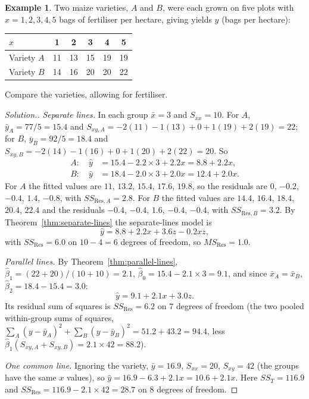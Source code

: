 \documentclass[11pt,a4paper]{article}
\numberwithin{equation}{section}
\theoremstyle{definition}
\newtheorem{exa}[thm]{Example}
\newenvironment{solution}
  {\renewcommand{\qedsymbol}{}\begin{proof}[\textit{Solution}.]}
  {\end{proof}}
\begin{document}
\begin{exa}\label{exa:varieties}
Two maize varieties, $A$ and $B$, were each grown on five plots with $x = 1, 2, 3, 4, 5$ bags of fertiliser per
hectare, giving yields $y$ (bags per hectare):
\begin{center}
\begin{tabular}{l|ccccc}
$x$ & 1 & 2 & 3 & 4 & 5 \\
\hline
Variety $A$ & 11 & 13 & 15 & 19 & 19 \\
Variety $B$ & 14 & 16 & 20 & 20 & 22 \\
\end{tabular}
\end{center}
Compare the varieties, allowing for fertiliser.
\end{exa}

\begin{solution}
\emph{Separate lines.} In each group $\bar x = 3$ and $S_{xx} = 10$. For $A$, $\bar y_A = 77/5 = 15.4$ and
$S_{xy,A} = -2(11) - 1(13) + 0 + 1(19) + 2(19) = 22$; for $B$, $\bar y_B = 92/5 = 18.4$ and
$S_{xy,B} = -2(14) - 1(16) + 0 + 1(20) + 2(22) = 20$. So
\begin{align*}
A:\quad \hat y &= 15.4 - 2.2 \times 3 + 2.2x = 8.8 + 2.2x , \\
B:\quad \hat y &= 18.4 - 2.0 \times 3 + 2.0x = 12.4 + 2.0x .
\end{align*}
For $A$ the fitted values are $11$, $13.2$, $15.4$, $17.6$, $19.8$, so the residuals are
$0$, $-0.2$, $-0.4$, $1.4$, $-0.8$, with $SS_{\mathrm{Res},A} = 2.8$. For $B$ the fitted values are
$14.4$, $16.4$, $18.4$, $20.4$, $22.4$ and the residuals $-0.4$, $-0.4$, $1.6$, $-0.4$, $-0.4$, with $SS_{\mathrm{Res},B} = 3.2$.
By Theorem~\ref{thm:separate-lines} the separate-lines model is
\[
\hat y = 8.8 + 2.2x + 3.6z - 0.2xz ,
\]
with $SS_{\mathrm{Res}} = 6.0$ on $10 - 4 = 6$ degrees of freedom, so $MS_{\mathrm{Res}} = 1.0$.

\emph{Parallel lines.} By Theorem~\ref{thm:parallel-lines}, $\hat\beta_1 = (22 + 20)/(10 + 10) = 2.1$,
$\hat\beta_0 = 15.4 - 2.1 \times 3 = 9.1$, and since $\bar x_A = \bar x_B$, $\hat\beta_2 = 18.4 - 15.4 = 3.0$:
\[
\hat y = 9.1 + 2.1x + 3.0z .
\]
Its residual sum of squares is $SS_{\mathrm{Res}} = 6.2$ on $7$ degrees of freedom (the two pooled
within-group sums of squares, $\sum_A(y - \bar y_A)^2 + \sum_B(y - \bar y_B)^2 = 51.2 + 43.2 = 94.4$, less
$\hat\beta_1(S_{xy,A} + S_{xy,B}) = 2.1 \times 42 = 88.2$).

\emph{One common line.} Ignoring the variety, $\bar y = 16.9$, $S_{xx} = 20$, $S_{xy} = 42$ (the groups have the same
$x$ values), so $\hat y = 16.9 - 6.3 + 2.1x = 10.6 + 2.1x$. Here $SS_T = 116.9$ and
$SS_{\mathrm{Res}} = 116.9 - 2.1 \times 42 = 28.7$ on $8$ degrees of freedom.


\end{solution}
\end{document}
